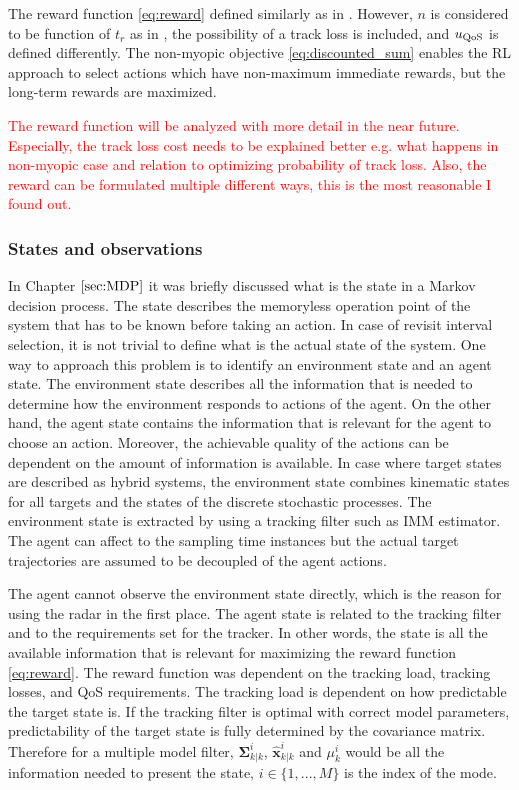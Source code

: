 \documentclass[english, 12pt, a4paper, elec, utf8, a-1b, online]{aaltothesis}
\renewcommand{\vec}[1]{\mathbf{#1}}
\newcommand{\modexpost}{\hat{\vec{x}}^{i}_{k|k}}
\newcommand{\modecovpost}{\bm{\Sigma}^i_{k|k}}
\begin{document}
The reward function \eqref{eq:reward} defined similarly as in \cite{Charlish2015}.
However, $n$ is considered to be function of $t_r$ as in \cite{vanKeuk1993}, the possibility of a track loss is included, and $u_\text{QoS}$ is defined differently.
The non-myopic objective \eqref{eq:discounted_sum} enables the RL approach to select actions which have non-maximum immediate rewards, but the long-term rewards are maximized.

\textcolor{red}{The reward function will be analyzed with more detail in the near future. Especially, the track loss cost needs to be explained better e.g. what happens in non-myopic case and relation to optimizing probability of track loss. Also, the reward can be formulated multiple different ways, this is the most reasonable I found out.}

\subsubsection{States and observations}

In Chapter $\ref{sec:MDP}$ it was briefly discussed what is the state in a Markov decision process.
The state describes the memoryless operation point of the system that has to be known before taking an action.
In case of revisit interval selection, it is not trivial to define what is the actual state of the system.
One way to approach this problem is to identify an environment state and an agent state.
The environment state describes all the information that is needed to determine how the environment responds to actions of the agent.
On the other hand, the agent state contains the information that is relevant for the agent to choose an action.
Moreover, the achievable quality of the actions can be dependent on the amount of information is available.
In case where target states are described as hybrid systems, the environment state combines kinematic states for all targets and the states of the discrete stochastic processes.
The environment state is extracted by using a tracking filter such as IMM estimator.
The agent can affect to the sampling time instances but the actual target trajectories are assumed to be decoupled of the agent actions.

The agent cannot observe the environment state directly, which is the reason for using the radar in the first place.
The agent state is related to the tracking filter and to the requirements set for the tracker.
In other words, the state is all the available information that is relevant for maximizing the reward function \eqref{eq:reward}.
The reward function was dependent on the tracking load, tracking losses, and QoS requirements.
The tracking load is dependent on how predictable the target state is.
If the tracking filter is optimal with correct model parameters, predictability of the target state is fully determined by the covariance matrix.
Therefore for a multiple model filter, $\modecovpost$, $\modexpost$ and $\mu_k^i$ would be all the information needed to present the state, $i \in \{1, ..., M\}$ is the index of the mode.
\end{document}

